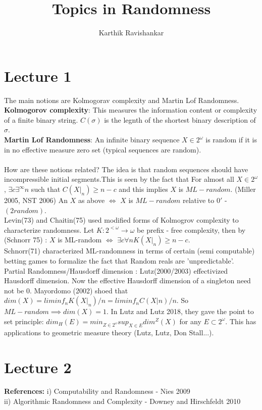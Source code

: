 \documentclass{article}
\title{Topics in Randomness}
\author{Karthik Ravishankar}
\begin{document}
	\maketitle
	\tableofcontents
	\newpage
	\section{Lecture 1}
	The main notions are Kolmogorav complexity and Martin Lof Randomness.\\
	\textbf{Kolmogorov complexity}: This measures the information content or complexity of a finite binary string. $C(\sigma)$ is the legnth of the shortest binary description of $\sigma$. \\
	\textbf{Martin Lof Randomness}: An infinite binary sequence $X \in 2^\omega$ is random if it is in no effective measure zero set (typical sequences are random).\\
	\\
	How are these notions related? The idea is that random sequences should have incompressible initial segments.This is seen by the fact that For almost all $X \in 2^\omega$, $\exists c \exists^\infty n$ such that $C(X|_n) \geq n-c$ and this implies $X$ is $ML-random$. (Miller 2005, NST 2006) An $X$ as above $\iff$ $X$ is $ML-random$ relative to $0'$ - $(2 random)$.\\
	Levin(73) and Chaitin(75) used modified forms of Kolmogrov complexity to characterize randomness. Let $K: 2^{<\omega} \to \omega$ be prefix - free complexity, then by (Schnorr 75) : $X$ is ML-random $\iff$ $\exists c \forall n K(X|_n) \geq n-c$.\\
	Schnorr(71) characterized ML-randomness in terms of certain (semi computable) betting games to formalize the fact that Random reals are 'unpredictable'.\\
	Partial Randomness/Hausdorff dimension : Lutz(2000/2003) effectivized Hausdorff dimension. Now the effective Hausdorff dimension of a singleton need not be $0$. Mayordomo (2002) shoed that $dim(X) = liminf_n K(X|_n)/n = liminf_n C(X|n)/n$. So $ML - random \implies dim(X) =1$. In Lutz and Lutz 2018, they gave the point to set principle: $dim_H(E) = min_{Z \in 2^\omega} sup_{X\in E} dim^Z(X) $ for any $E \subset 2^\omega$. This has applications to geometric measure theory (Lutz, Lutz, Don Stall...).\\ \newpage
	\section{Lecture 2}
	\textbf{References:} i) Computability and Randomness - Nies 2009\\
	ii) Algorithmic Randomness and Complexity - Downey and Hirschfeldt 2010\\
\end{document}
